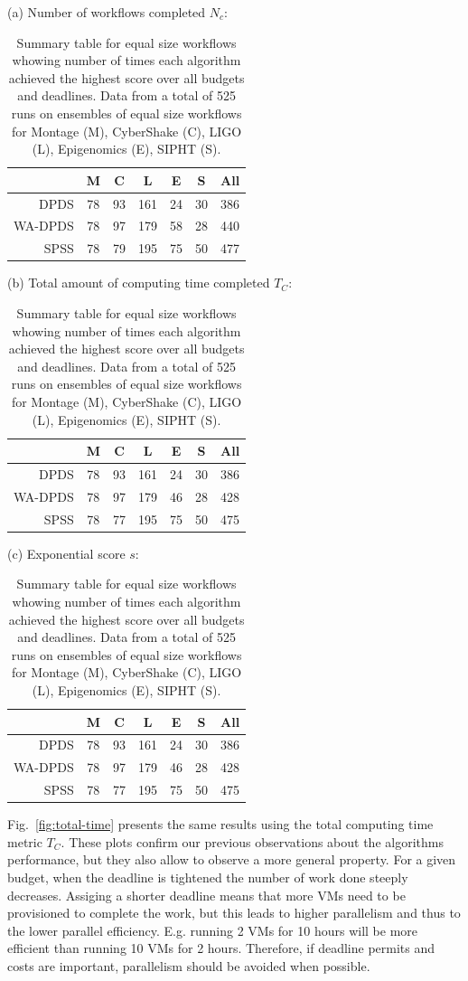 \documentclass{sig-alternate}
\begin{document}

\begin{table}[tb]
\centering

(a) Number of workflows completed $N_c$:
\medskip
\begin{tabular}{r|cccccc}
 & M & C & L & E & S & All\tabularnewline
\hline
DPDS      &   78 &  93 & 161 &  24  & 30 & 386\tabularnewline
WA-DPDS   &    78  & 97 & 179  & 58  & 28 & 440\tabularnewline
SPSS     &    78  & 79 & 195 &  75 &  50 & 477\tabularnewline
\end{tabular}
\medskip

(b) Total amount of computing time completed $T_C$:
\medskip
\begin{tabular}{r|cccccc}
 & M & C & L & E & S & All\tabularnewline
\hline
DPDS      &   78 &  93 & 161 &  24 &  30 & 386\tabularnewline
WA-DPDS   &    78  & 97 & 179 &  46  & 28 & 428\tabularnewline
SPSS     &    78 &  77 & 195  & 75 &  50 & 475\tabularnewline
\end{tabular}
\medskip

(c) Exponential score $s$:
\medskip
\begin{tabular}{r|cccccc}
 & M & C & L & E & S & All\tabularnewline
\hline
DPDS      &   78  & 93 & 161 &  24 &  30 & 386\tabularnewline
WA-DPDS   &    78 &  97 & 179  & 46  & 28 & 428\tabularnewline
SPSS     &    78 &  77 & 195 &  75  & 50 & 475\tabularnewline
\end{tabular}
\medskip

\caption{Summary table for equal size workflows whowing number of times each
algorithm achieved the highest score over all budgets and deadlines. Data from a total of 525 runs on 
ensembles of equal size workflows for Montage (M), CyberShake (C), LIGO (L), 
Epigenomics (E), SIPHT (S).
\label{tab:num-dags-equal}}
\end{table}




Fig.~\ref{fig:total-time} presents the same results using the total computing
time metric $T_C$. These plots confirm our previous observations about the
algorithms performance, but they also allow to observe a more general property.
For a given budget, when the deadline is tightened the number of work done
steeply decreases. Assiging a shorter deadline means that more VMs need to be
provisioned to complete the work, but this leads to higher parallelism and thus
to the lower parallel efficiency. E.g. running 2 VMs for 10 hours will be more
efficient than running 10 VMs for 2 hours. Therefore, if deadline permits and
costs are important, parallelism should be avoided when possible.
\end{document}
